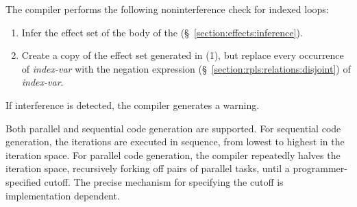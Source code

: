 The compiler performs the following noninterference check for indexed
 loops:
\begin{enumerate}
\item Infer the effect set of the body of the 
  (\S~\ref{section:effects:inference}).
\item Create a copy of the effect set generated in (1), but replace
  every occurrence of \emph{index-var} with the negation expression
  (\S~\ref{section:rpls:relations:disjoint}) of \emph{index-var}.
\end{enumerate}
If interference is detected, the compiler generates a warning.

Both parallel and sequential code generation are supported.  For
sequential code generation, the  iterations are executed
in sequence, from lowest to highest in the iteration space.  For
parallel code generation, the compiler repeatedly halves the iteration
space, recursively forking off pairs of parallel tasks, until a
programmer-specified cutoff.  The precise mechanism for specifying the
cutoff is implementation dependent.

